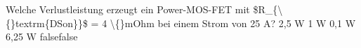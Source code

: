     {Welche Verlustleistung erzeugt ein Power-MOS-FET mit \$R\_\{\textbackslash\{\}textrm\{DSon\}\}\$ = 4 \textbackslash\{\}mOhm bei einem Strom von 25 A?}
    {2,5 W}
    {1 W}
    {0,1 W}
    {6,25 W}
    {false}{false}